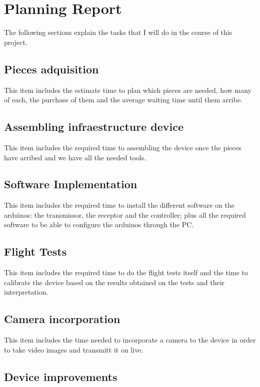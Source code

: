 \documentclass[12pt, a4paper,twoside]{tesi_upf}
\begin{document}
\chapter{Planning Report}

The following sections explain the tasks that I will do in the course of this project.

\section{Pieces adquisition}

This item includes the estimate time to plan which pieces are needed, how many of each, the purchase of them and the average waiting time until them arribe. 

\section{Assembling infraestructure device}

This item includes the required time to assembling the device once the pieces have arribed and we have all the needed tools.

\section{Software Implementation}

This item includes the required time to install the different software on the arduinos: the transmissor, the receptor and the controller; plus all the required software to be able to configure the arduinos through the PC.

\section{Flight Tests}

This item includes the required time to do the flight tests itself and the time to calibrate the device based on the results obtained on the tests and their interpretation.

\section{Camera incorporation}

This item includes the time needed to incorporate a camera to the device in order to take video images and transmitt it on live.

\section{Device improvements}
\end{document}
